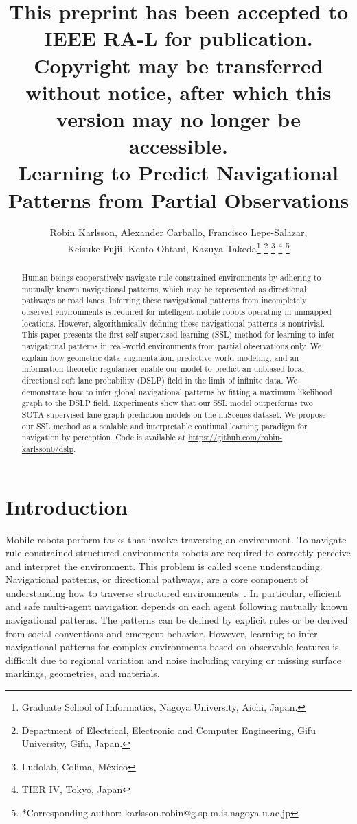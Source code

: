 \documentclass[letterpaper, 10 pt, conference]{ieeeconf}
\title{\scriptsize This preprint has been accepted to IEEE RA-L for publication. Copyright may be transferred without notice, after which this version may no longer be accessible. \\ \LARGE \bf
Learning to Predict Navigational Patterns from Partial Observations
}
\author{Robin Karlsson, Alexander Carballo, Francisco Lepe-Salazar, \\ Keisuke Fujii, Kento Ohtani, Kazuya Takeda\thanks{Graduate School of Informatics, Nagoya University, Aichi, Japan.}
\thanks{Department of Electrical, Electronic and Computer Engineering, Gifu University, Gifu, Japan.}
\thanks{Ludolab, Colima, M\'exico}
\thanks{TIER IV, Tokyo, Japan}
\thanks{*Corresponding author: karlsson.robin@g.sp.m.is.nagoya-u.ac.jp}}
\begin{document}
\maketitle
\thispagestyle{plain}
\pagestyle{plain}

\begin{abstract}
Human beings cooperatively navigate rule-constrained environments by adhering to mutually known navigational patterns, which may be represented as directional pathways or road lanes.
Inferring these navigational patterns from incompletely observed environments is required for intelligent mobile robots operating in unmapped locations. However, algorithmically defining these navigational patterns is nontrivial.
This paper presents the first self-supervised learning (SSL) method for learning to infer navigational patterns in real-world environments from partial observations only.
We explain how geometric data augmentation, predictive world modeling, and an information-theoretic regularizer enable our model to predict an unbiased local directional soft lane probability (DSLP) field in the limit of infinite data.
We demonstrate how to infer global navigational patterns by fitting a maximum likelihood graph to the DSLP field.
Experiments show that our SSL model outperforms two SOTA supervised lane graph prediction models on the nuScenes dataset.
We propose our SSL method as a scalable and interpretable continual learning paradigm for navigation by perception. Code is available at \url{https://github.com/robin-karlsson0/dslp}.

\end{abstract}

\section{Introduction}

Mobile robots perform tasks that involve traversing an environment. 
To navigate rule-constrained structured environments robots are required to correctly perceive and interpret the environment. This problem is called scene understanding.
Navigational patterns, or directional pathways, are a core component of understanding how to traverse structured environments~\cite{krause2013robot_navigation}.
In particular, efficient and safe multi-agent navigation depends on each agent following mutually known navigational patterns. The patterns can be defined by explicit rules or be derived from social conventions and emergent behavior.
However, learning to infer navigational patterns for complex environments based on observable features is difficult due to regional variation and noise including varying or missing surface markings, geometries, and materials.
\end{document}
